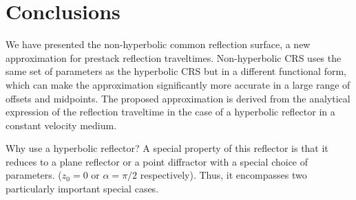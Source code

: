 %
%
%


\section{Conclusions}

We have presented the non-hyperbolic common reflection surface, a new
approximation for prestack reflection traveltimes. Non-hyperbolic CRS
uses the same set of parameters as the hyperbolic CRS but in a
different functional form, which can make the approximation
significantly more accurate in a large range of offsets and
midpoints. The proposed approximation is derived from the analytical
expression of the reflection traveltime in the case of a hyperbolic
reflector in a constant velocity medium.

Why use a hyperbolic reflector? A special property of this reflector
is that it reduces to a plane reflector or a point diffractor with a
special choice of parameters. ($z_0=0$ or $\alpha=\pi/2$
respectively). Thus, it encompasses two particularly important special
cases. 

